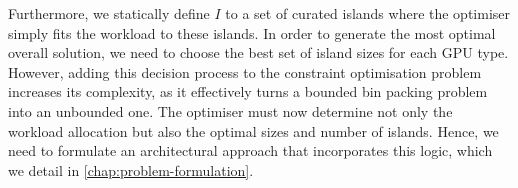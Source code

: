 Furthermore, we statically define $I$ to a set of curated islands where the optimiser simply fits the workload to these islands.
In order to generate the most optimal overall solution, we need to choose the best set of island sizes for each GPU type.
However, adding this decision process to the constraint optimisation problem increases its complexity, as it effectively turns a bounded bin packing problem into an unbounded one.
The optimiser must now determine not only the workload allocation but also the optimal sizes and number of islands.
Hence, we need to formulate an architectural approach that incorporates this logic, which we detail in \autoref{chap:problem-formulation}.

